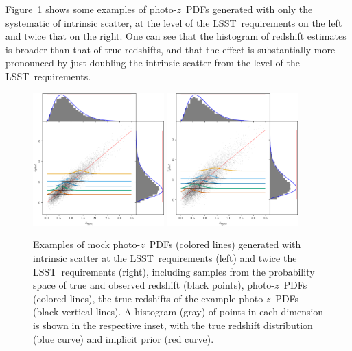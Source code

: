 \documentclass[iop]{emulateapj}
\newcommand{\Fig}[1]{Figure~\ref{#1}}
\newcommand{\project}[1]{{\textsc{#1}}}
\newcommand{\lsst}{\project{LSST}}
\newcommand{\pz}{photo-$z$~}
\newcommand{\pzpdf}{\pz PDF}
\begin{document}
\Fig{fig:pzs-scatter} shows some examples of \pzpdf s generated with only the systematic of intrinsic scatter, at the level of the \lsst\ requirements on the left and twice that on the right.
One can see that the histogram of redshift estimates is broader than that of true redshifts, and that the effect is substantially more pronounced by just doubling the intrinsic scatter from the level of the \lsst\ requirements.

\begin{figure}
	\begin{center}
	\includegraphics[width=0.45\textwidth]{figures/chippr/samplepzs_scatter1.png}
	\includegraphics[width=0.45\textwidth]{figures/chippr/samplepzs_scatter2.png}
	\caption{
		Examples of mock \pzpdf s (colored lines) generated with intrinsic scatter at the \lsst\ requirements (left) and twice the \lsst\ requirements (right), including samples from the probability space of true and observed redshift (black points), \pzpdf s (colored lines), the true redshifts of the example \pzpdf s (black vertical lines).
		A histogram (gray) of points in each dimension is shown in the respective inset, with the true redshift distribution (blue curve) and implicit prior (red curve).
	}
	\label{fig:pzs-scatter}
	\end{center}
\end{figure}
\end{document}
